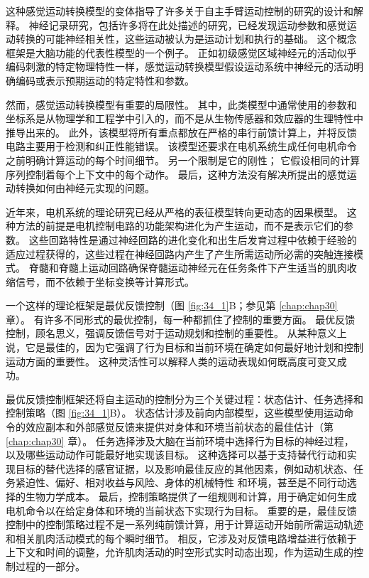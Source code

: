 这种感觉运动转换模型的变体指导了许多关于自主手臂运动控制的研究的设计和解释。
神经记录研究，包括许多将在此处描述的研究，已经发现运动参数和感觉运动转换的可能神经相关性，这些运动被认为是运动计划和执行的基础。 
这个概念框架是大脑功能的代表性模型的一个例子。 
正如初级感觉区域神经元的活动似乎编码刺激的特定物理特性一样，感觉运动转换模型假设运动系统中神经元的活动明确编码或表示预期运动的特定特性和参数。


然而，感觉运动转换模型有重要的局限性。
其中，此类模型中通常使用的参数和坐标系是从物理学和工程学中引入的，而不是从生物传感器和效应器的生理特性中推导出来的。
此外，该模型将所有重点都放在严格的串行前馈计算上，并将反馈电路主要用于检测和纠正性能错误。
该模型还要求在电机系统生成任何电机命令之前明确计算运动的每个时间细节。
另一个限制是它的刚性；
它假设相同的计算序列控制着每个上下文中的每个动作。
最后，这种方法没有解决所提出的感觉运动转换如何由神经元实现的问题。


近年来，电机系统的理论研究已经从严格的表征模型转向更动态的因果模型。
这种方法的前提是电机控制电路的功能架构进化为产生运动，而不是表示它们的参数。
这些回路特性是通过神经回路的进化变化和出生后发育过程中依赖于经验的适应过程获得的，这些过程在神经回路内产生了产生所需运动所必需的突触连接模式。
脊髓和脊髓上运动回路确保脊髓运动神经元在任务条件下产生适当的肌肉收缩信号，而不依赖于坐标变换等计算形式。


一个这样的理论框架是最优反馈控制（图 \ref{fig:34_1}B；参见第 \ref{chap:chap30} 章）。
有许多不同形式的最优控制，每一种都抓住了控制的重要方面。
最优反馈控制，顾名思义，强调反馈信号对于运动规划和控制的重要性。
从某种意义上说，它是最佳的，因为它强调了行为目标和当前环境在确定如何最好地计划和控制运动方面的重要性。
这种灵活性可以解释人类的运动表现如何既高度可变又成功。


最优反馈控制框架还将自主运动的控制分为三个关键过程：状态估计、任务选择和控制策略（图 \ref{fig:34_1}B）。
状态估计涉及前向内部模型，这些模型使用运动命令的效应副本和外部感觉反馈来提供对身体和环境当前状态的最佳估计（第 \ref{chap:chap30} 章）。
任务选择涉及大脑在当前环境中选择行为目标的神经过程，以及哪些运动动作可能最好地实现该目标。
这种选择可以基于支持替代行动和实现目标的替代选择的感官证据，以及影响最佳反应的其他因素，例如动机状态、任务紧迫性、偏好、相对收益与风险、身体的机械特性 和环境，甚至是不同行动选择的生物力学成本。
最后，控制策略提供了一组规则和计算，用于确定如何生成电机命令以在给定身体和环境的当前状态下实现行为目标。
重要的是，最佳反馈控制中的控制策略过程不是一系列纯前馈计算，用于计算运动开始前所需运动轨迹和相关肌肉活动模式的每个瞬时细节。
相反，它涉及对反馈电路增益进行依赖于上下文和时间的调整，允许肌肉活动的时空形式实时动态出现，作为运动生成的控制过程的一部分。



